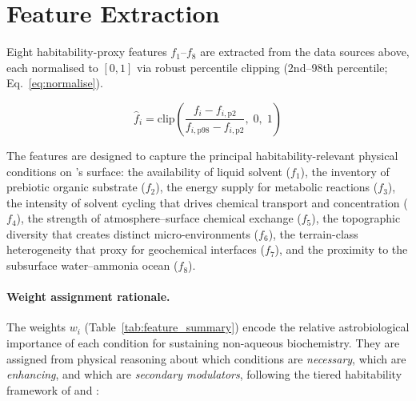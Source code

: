 \section{Feature Extraction}
\label{sec:features}

Eight habitability-proxy features $f_1$--$f_8$ are extracted from the data sources above, each normalised to $[0,1]$ via robust percentile clipping (2nd--98th percentile; Eq.~\ref{eq:normalise}).


\begin{equation}
  \hat{f}_i = \mathrm{clip}\!\left(
    \frac{f_i - f_{i,\text{p2}}}{f_{i,\text{p98}} - f_{i,\text{p2}}},
    \; 0, \; 1
  \right)
  \label{eq:normalise}
\end{equation}

The features are designed to capture the principal habitability-relevant physical conditions on \titan{}'s surface: the availability of liquid solvent ($f_1$), the inventory of prebiotic organic substrate ($f_2$), the energy supply for metabolic reactions ($f_3$), the intensity of solvent cycling that drives chemical transport and concentration ($f_4$), the strength of atmosphere--surface chemical exchange ($f_5$), the topographic diversity that creates distinct micro-environments ($f_6$), the terrain-class heterogeneity that proxy for geochemical interfaces ($f_7$), and the proximity to the subsurface water--ammonia ocean ($f_8$).

\paragraph{Weight assignment rationale.}
The weights $w_i$ (Table~\ref{tab:feature_summary}) encode the relative astrobiological importance of each condition for sustaining non-aqueous biochemistry.  They are assigned from physical reasoning about which conditions are \textit{necessary}, which are \textit{enhancing}, and which are \textit{secondary modulators}, following the tiered habitability framework of \citet{Cockell2016} and \citet{Mendez2021}:

